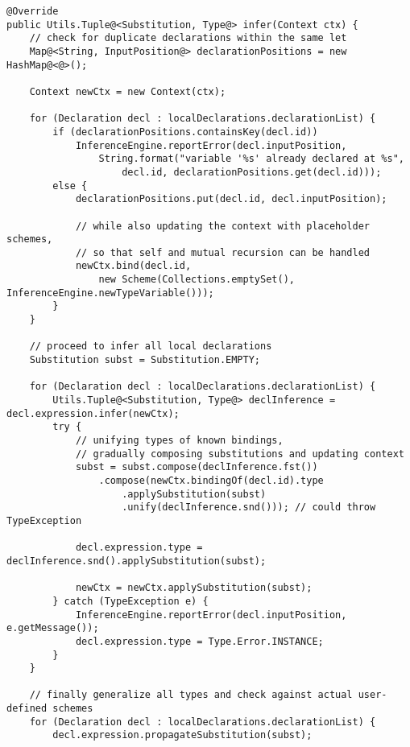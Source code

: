 \newpage

\begin{lstlisting}[caption={Metodo di inferenza per espressioni \texttt{let}}, style=javaCode, label={lst:5-9-let-inference-java}]
@Override
public Utils.Tuple@<Substitution, Type@> infer(Context ctx) {
    // check for duplicate declarations within the same let
    Map@<String, InputPosition@> declarationPositions = new HashMap@<@>();

    Context newCtx = new Context(ctx);

    for (Declaration decl : localDeclarations.declarationList) {
        if (declarationPositions.containsKey(decl.id))
            InferenceEngine.reportError(decl.inputPosition,
                String.format("variable '%s' already declared at %s",
                    decl.id, declarationPositions.get(decl.id)));
        else {
            declarationPositions.put(decl.id, decl.inputPosition);

            // while also updating the context with placeholder schemes,
            // so that self and mutual recursion can be handled
            newCtx.bind(decl.id,
                new Scheme(Collections.emptySet(), InferenceEngine.newTypeVariable()));
        }
    }

    // proceed to infer all local declarations
    Substitution subst = Substitution.EMPTY;

    for (Declaration decl : localDeclarations.declarationList) {
        Utils.Tuple@<Substitution, Type@> declInference = decl.expression.infer(newCtx);
        try {
            // unifying types of known bindings,
            // gradually composing substitutions and updating context
            subst = subst.compose(declInference.fst())
                .compose(newCtx.bindingOf(decl.id).type
                    .applySubstitution(subst)
                    .unify(declInference.snd())); // could throw TypeException

            decl.expression.type = declInference.snd().applySubstitution(subst);

            newCtx = newCtx.applySubstitution(subst);
        } catch (TypeException e) {
            InferenceEngine.reportError(decl.inputPosition, e.getMessage());
            decl.expression.type = Type.Error.INSTANCE;
        }
    }

    // finally generalize all types and check against actual user-defined schemes
    for (Declaration decl : localDeclarations.declarationList) {
        decl.expression.propagateSubstitution(subst);


\end{lstlisting}
